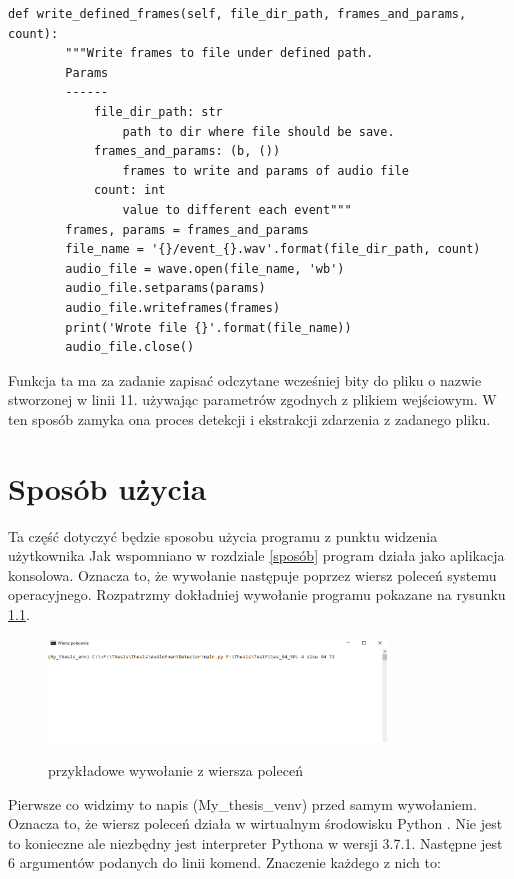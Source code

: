 \documentclass[eng,printmode]{mgr}
\begin{document}
\begin{minipage}{\linewidth}
\begin{lstlisting}[caption={fragment kodu źródłowego pliku WaveReader.py, klasa WaveWriter. metoda write\_defined\_frames },captionpos=b,label={writedefinedframes}] 
    def write_defined_frames(self, file_dir_path, frames_and_params, count):
        """Write frames to file under defined path.
        Params
        ------
            file_dir_path: str
                path to dir where file should be save.
            frames_and_params: (b, ())
                frames to write and params of audio file
            count: int
                value to different each event"""
        frames, params = frames_and_params
        file_name = '{}/event_{}.wav'.format(file_dir_path, count)
        audio_file = wave.open(file_name, 'wb')
        audio_file.setparams(params)
        audio_file.writeframes(frames)
        print('Wrote file {}'.format(file_name))
        audio_file.close()
\end{lstlisting}
\end{minipage}
Funkcja ta ma za zadanie zapisać odczytane wcześniej bity do pliku o nazwie stworzonej w linii 11. używając parametrów zgodnych z plikiem wejściowym. 
W ten sposób zamyka ona proces detekcji i ekstrakcji zdarzenia z zadanego pliku. 


\chapter{Sposób użycia}
Ta część dotyczyć będzie sposobu użycia programu z punktu widzenia użytkownika
Jak wspomniano w rozdziale \ref{sposób} program działa jako aplikacja konsolowa. Oznacza to, że wywołanie następuje poprzez wiersz poleceń systemu operacyjnego. Rozpatrzmy dokładniej wywołanie programu pokazane na rysunku \ref{cmd}.

\begin{figure}[hbtp]
\caption{przykładowe wywołanie z wiersza poleceń}
\centering
\includegraphics[width=0.8\textwidth]{cmd_wywolanie_2.PNG}
\label{cmd}
\end{figure}

Pierwsze co widzimy to napis (My\_thesis\_venv) przed samym wywołaniem. Oznacza to, że wiersz poleceń działa w wirtualnym środowisku Python \cite{venv}. Nie jest to konieczne ale niezbędny jest interpreter Pythona w wersji 3.7.1. Następne jest 6 argumentów podanych do linii komend. Znaczenie każdego z nich to:
\end{document}
